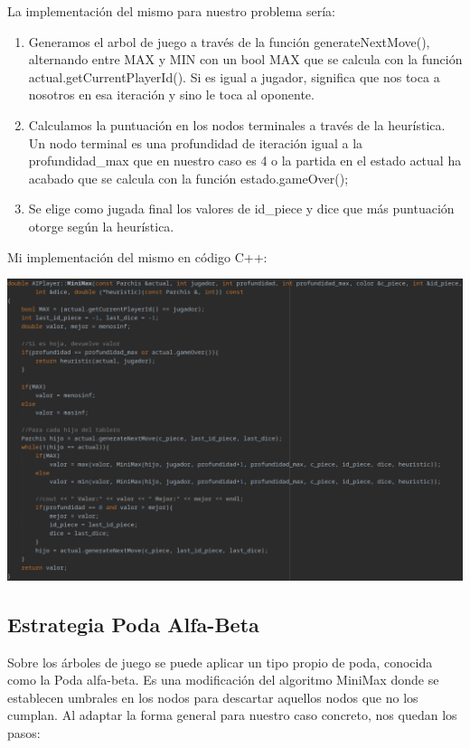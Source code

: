\documentclass[12pt, spanish]{article}
\begin{document}
La implementación del mismo para nuestro problema sería:
\begin{enumerate}
 \item Generamos el arbol de juego a través de la función generateNextMove(), alternando entre MAX y MIN con un bool MAX que se calcula con la función actual.getCurrentPlayerId(). Si es igual a jugador, significa que nos toca a nosotros en esa iteración y sino le toca al oponente.

 \item Calculamos la puntuación en los nodos terminales a través de la heurística. Un nodo terminal es una profundidad de iteración igual a la profundidad\_max que en nuestro caso es 4 o la partida en el estado actual ha acabado que se calcula con la función estado.gameOver();

 \item Se elige como jugada final los valores de id\_piece y dice que más puntuación otorge según la heurística.
\end{enumerate}

Mi implementación del mismo en código C++:

\begin{centering}\includegraphics[scale = 0.55]{minimax.png}\\[1.0 cm]\end{centering}

\subsection{Estrategia Poda Alfa-Beta}
Sobre los árboles de juego se puede aplicar un tipo propio de poda, conocida como la Poda
alfa-beta. Es una modificación del algoritmo MiniMax donde se establecen umbrales en los nodos para descartar aquellos nodos que no los cumplan. Al adaptar la forma general para nuestro caso concreto, nos quedan los pasos:
\end{document}
